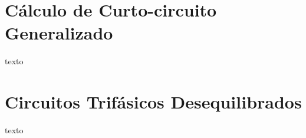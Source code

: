 \begin{apendicesenv}
\partapendices

\chapter{Cálculo de Curto-circuito Generalizado}
texto

\chapter{Circuitos Trifásicos Desequilibrados}
texto

\end{apendicesenv}
